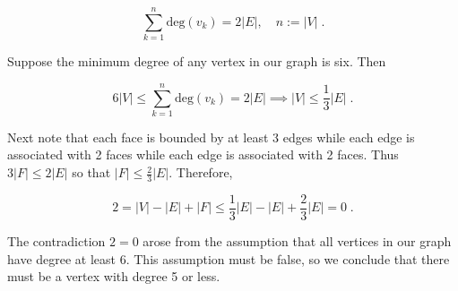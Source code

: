 \documentclass[a4paper]{article}
\begin{document}
\begin{enumerate}
$$ \sum_{k=1}^n \text{deg}(v_k) = 2|E|, \quad n := |V| \;.$$

Suppose the minimum degree of any vertex in our graph is six. Then

$$ 6|V| \leq \sum_{k=1}^n \text{deg}(v_k) = 2|E| \implies |V| \leq \frac{1}{3}|E| \;.$$

Next note that each face is bounded by at least 3 edges while each edge is associated with 2 faces while each edge is associated with 2 faces. Thus $3|F| \leq 2|E|$ so that $|F| \leq \frac{2}{3}|E|$. Therefore,

$$
2 = |V| - |E| + |F| 
\leq \frac{1}{3}|E| - |E| + \frac{2}{3}|E| = 0 \;.
$$

The contradiction $2 = 0$ arose from the assumption that all vertices in our graph have degree at least 6. This assumption must be false, so we conclude that there must be a vertex with degree 5 or less. 



\end{enumerate}
\end{document}
